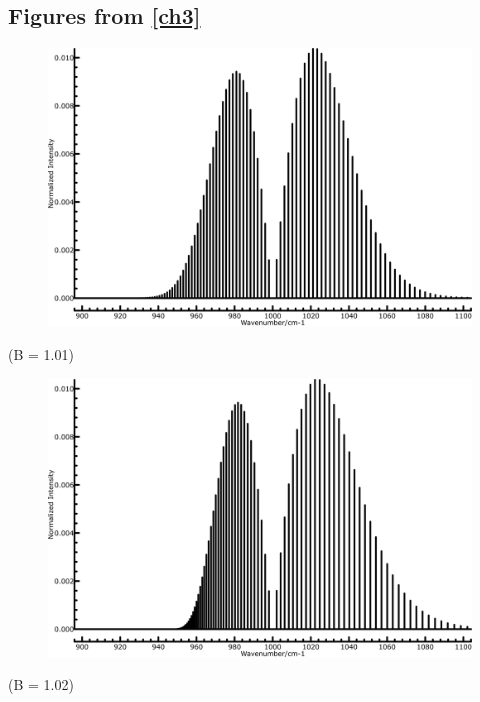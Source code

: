 \newpage                           
\appendix
\setcounter{section}{1}
\setcounter{subsection}{0}

\subsection{Figures from \ref{ch3}} \label{Appendix}
\begin{center}
	\begin{minipage}{\linewidth}
		\begin{minipage}{0.5\linewidth}
			\begin{figure}[H]
				\centering \includegraphics[width=\linewidth] 						{figures/B101.png}
			\end{figure} 
				\centering(B = 1.01) \\
		\end{minipage}
		\begin{minipage}{0.5\linewidth}
		   \begin{figure}[H]
				\centering \includegraphics[width=\linewidth]	  					{figures/B102.png}
			\end{figure}
				\centering(B = 1.02) \\
		\end{minipage}
	\end{minipage}
\end{center}
